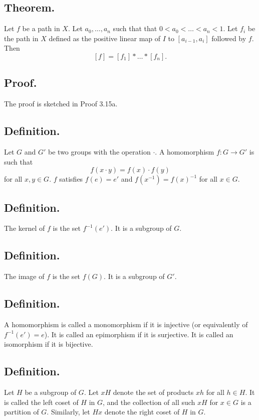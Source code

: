 \documentclass[titlepage]{article}
\begin{document}
\subsection{Theorem.} Let $f$ be a path in $X$. Let $a_{0}, \ldots, a_{n}$ such that that $0 < a_{0} < \ldots < a_{n} < 1$. Let $f_{i}$ be the path in $X$ defined as the positive linear map of $I$ to $[a_{i-1}, a_{i}]$ followed by $f$. Then 
$$[f] = [f_{1}] * \ldots * [f_{n}].$$

\subsection{Proof.} The proof is sketched in Proof 3.15a.

\subsection{Definition.} Let $G$ and $G'$ be two groups with the operation $\cdot$. A homomorphism $f: G \to G'$ is such that 
$$f(x \cdot y) = f(x) \cdot f(y)$$
for all $x, y \in G$. $f$ satisfies $f(e) = e'$ and $f(x^{-1}) = f(x)^{-1}$ for all $x \in G$.

\subsection{Definition.} The kernel of $f$ is the set $f^{-1}(e')$. It is a subgroup of $G$.

\subsection{Definition.} The image of $f$ is the set $f(G)$. It is a subgroup of $G'$.

\subsection{Definition.} A homomorphism is called a monomorphism if it is injective (or equivalently of $f^{-1}(e') = e$). It is called an epimorphism if it is surjective. It is called an isomorphism if it is bijective.

\subsection{Definition.} Let $H$ be a subgroup of $G$. Let $xH$ denote the set of products $xh$ for all $h \in H$. It is called the left coset of $H$ in $G$, and the collection of all such $xH$ for $x \in G$ is a partition of $G$. Similarly, let $Hx$ denote the right coset of $H$ in $G$.
\end{document}
